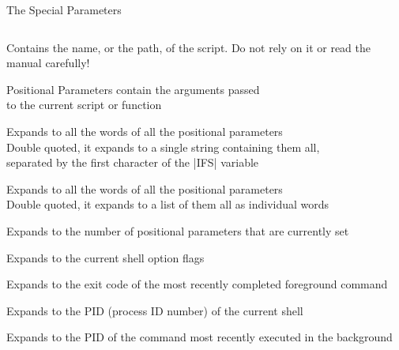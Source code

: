 
\begin{frame}{The Special Parameters}{}
    \vspace{-8mm}
    \begin{columns}
        \begin{column}{\dimexpr\paperwidth-10mm}
            \begin{description}
                \setlength{\itemsep}{2pt}
                \item[\texttt{0}]
                    Contains the name, or the path, of the script.
                    Do not rely on it or read the manual carefully!
                \item[\texttt{1 2 \ldots}]
                    \alert{Positional Parameters} contain the arguments passed\\
                    to the current script or function
                \item[\texttt{*}]
                    Expands to all the words of all the positional parameters\\
                    Double quoted, it expands to a single string containing them all,\\ separated by the first character of the \bash|IFS| variable
                \item[\texttt{@}]
                    Expands to all the words of all the positional parameters\\
                    Double quoted, it expands to a list of them all as individual words
                \item[\texttt{\#}]
                    Expands to the number of positional parameters that are currently set
                \item[\texttt{-}]
                    Expands to the current shell option flags
                \item[\texttt{?}]
                    Expands to the exit code of the most recently completed foreground command
                \item[\texttt{\$}]
                    Expands to the PID (process ID number) of the current shell
                \item[\texttt{!}]
                    Expands to the PID of the command most recently executed in the background

\end{description}
\end{column}
\end{columns}
\end{frame}
